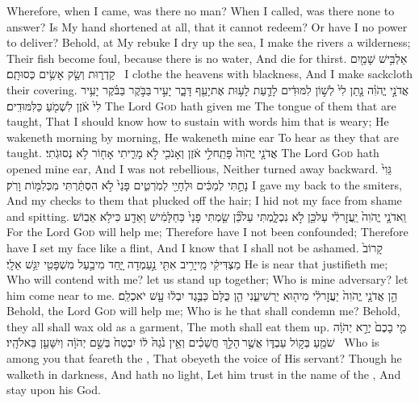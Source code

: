 {Wherefore, when I came, was there no man? When I called, was there none to answer? Is My hand shortened at all, that it cannot redeem? Or have I no power to deliver? Behold, at My rebuke I dry up the sea, I make the rivers a wilderness; Their fish become foul, because there is no water, And die for thirst.}
{אַלְבִּ֥ישׁ שָׁמַ֖יִם קַדְר֑וּת וְשַׂ֖ק אָשִׂ֥ים כְּסוּתָֽם׃ \petucha }
{I clothe the heavens with blackness, And I make sackcloth their covering.}
{אֲדֹנָ֣י יֱהֹוִ֗ה נָ֤תַן לִי֙ לְשׁ֣וֹן לִמּוּדִ֔ים לָדַ֛עַת לָע֥וּת אֶת\maqqaf יָעֵ֖ף דָּבָ֑ר יָעִ֣יר \legarmeh  בַּבֹּ֣קֶר בַּבֹּ֗קֶר יָעִ֥יר לִי֙ אֹ֔זֶן לִשְׁמֹ֖עַ כַּלִּמּוּדִֽים׃}
{The Lord \textsc{God} hath given me The tongue of them that are taught, That I should know how to sustain with words him that is weary; He wakeneth morning by morning, He wakeneth mine ear To hear as they that are taught.}
{אֲדֹנָ֤י יֱהֹוִה֙ פָּתַֽח\maqqaf לִ֣י אֹ֔זֶן וְאָנֹכִ֖י לֹ֣א מָרִ֑יתִי אָח֖וֹר לֹ֥א נְסוּגֹֽתִי׃}
{The Lord \textsc{God} hath opened mine ear, And I was not rebellious, Neither turned away backward.}
{גֵּוִי֙ נָתַ֣תִּי לְמַכִּ֔ים וּלְחָיַ֖י לְמֹֽרְטִ֑ים פָּנַי֙ לֹ֣א הִסְתַּ֔רְתִּי מִכְּלִמּ֖וֹת וָרֹֽק׃}
{I gave my back to the smiters, And my checks to them that plucked off the hair; I hid not my face from shame and spitting.}
{וַֽאדֹנָ֤י יֱהֹוִה֙ יַֽעֲזׇר\maqqaf לִ֔י עַל\maqqaf כֵּ֖ן לֹ֣א נִכְלָ֑מְתִּי עַל\maqqaf כֵּ֞ן שַׂ֤מְתִּי פָנַי֙ כַּחַלָּמִ֔ישׁ וָאֵדַ֖ע כִּי\maqqaf לֹ֥א אֵבֽוֹשׁ׃}
{For the Lord \textsc{God} will help me; Therefore have I not been confounded; Therefore have I set my face like a flint, And I know that I shall not be ashamed.}
{קָרוֹב֙ מַצְדִּיקִ֔י מִֽי\maqqaf יָרִ֥יב אִתִּ֖י נַ֣עַמְדָה יָּ֑חַד מִי\maqqaf בַ֥עַל מִשְׁפָּטִ֖י יִגַּ֥שׁ אֵלָֽי׃}
{He is near that justifieth me; Who will contend with me? let us stand up together; Who is mine adversary? let him come near to me.}
{הֵ֣ן אֲדֹנָ֤י יֱהֹוִה֙ יַעֲזׇר\maqqaf לִ֔י מִי\maqqaf ה֖וּא יַרְשִׁיעֵ֑נִי הֵ֤ן כֻּלָּם֙ כַּבֶּ֣גֶד יִבְל֔וּ עָ֖שׁ יֹאכְלֵֽם׃ \setuma }
{Behold, the Lord \textsc{God} will help me; Who is he that shall condemn me? Behold, they all shall wax old as a garment, The moth shall eat them up.}
{מִ֤י בָכֶם֙ יְרֵ֣א יְהֹוָ֔ה שֹׁמֵ֖עַ בְּק֣וֹל עַבְדּ֑וֹ אֲשֶׁ֣ר \legarmeh  הָלַ֣ךְ חֲשֵׁכִ֗ים וְאֵ֥ין נֹ֙גַהּ֙ ל֔וֹ יִבְטַח֙ בְּשֵׁ֣ם יְהֹוָ֔ה וְיִשָּׁעֵ֖ן בֵּאלֹהָֽיו׃ \setuma }
{Who is among you that feareth the \lord, That obeyeth the voice of His servant? Though he walketh in darkness, And hath no light, Let him trust in the name of the \lord, And stay upon his God.}
